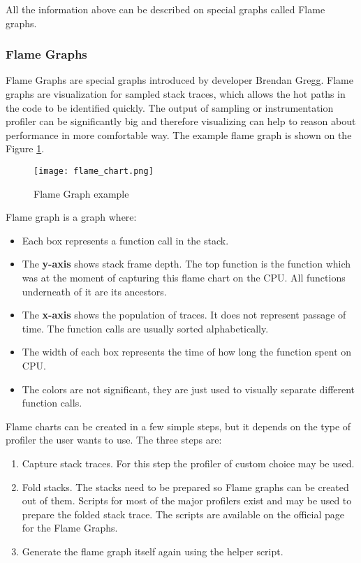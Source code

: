 All the information above can be described on special graphs called Flame graphs.
\subsubsection{Flame Graphs}
Flame Graphs are special graphs introduced by developer Brendan Gregg. Flame graphs are visualization for sampled stack traces, which allows the hot paths in the code to be identified quickly. The output of sampling or instrumentation profiler can be significantly big and therefore visualizing can help to reason about performance in more comfortable way. The example flame graph is shown on the Figure \ref{fig:flame_chart}.

\begin{figure}
	\centering
	\texttt{[image: flame\_chart.png]}
	\caption{Flame Graph example}
	\label{fig:flame_chart}
\end{figure}
Flame graph is a graph where:
\begin{itemize}
	\item Each box represents a function call in the stack.
	\item The \textbf{y-axis} shows stack frame depth. The top function is the function which was at the moment of capturing this flame chart on the CPU. All functions underneath of it are its ancestors.
	\item The \textbf{x-axis} shows the population of traces. It does not represent passage of time. The function calls are usually sorted alphabetically.
	\item The width of each box represents the time of how long the function spent on CPU.
	\item The colors are not significant, they are just used to visually separate different function calls.
\end{itemize}

Flame charts can be created in a few simple steps, but it depends on the type of profiler the user wants to use. The three steps are:
\begin{enumerate}
	\item Capture stack traces. For this step the profiler of custom choice may be used.
	\item Fold stacks. The stacks need to be prepared so Flame graphs can be created out of them. Scripts for most of the major profilers exist and may be used to prepare the folded stack trace. The scripts are available on the official page for the Flame Graphs.
	\item Generate the flame graph itself again using the helper script.
\end{enumerate}

